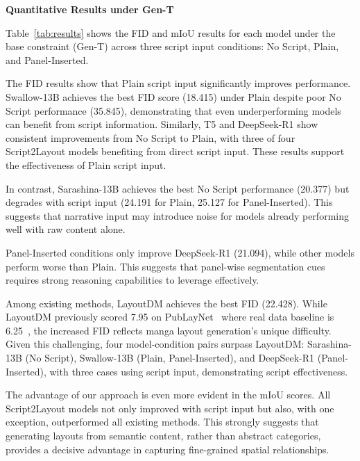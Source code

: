 \noindent\textbf{Quantitative Results under Gen-T}

Table~\ref{tab:results} shows the FID and mIoU results for each model under the base constraint (Gen-T) across three script input conditions: No Script, Plain, and Panel-Inserted.

The FID results show that Plain script input significantly improves performance. Swallow-13B achieves the best FID score (18.415) under Plain despite poor No Script performance (35.845), demonstrating that even underperforming models can benefit from script information. Similarly, T5 and DeepSeek-R1 show consistent improvements from No Script to Plain, with three of four Script2Layout models benefiting from direct script input. These results support the effectiveness of Plain script input. 

In contrast, Sarashina-13B achieves the best No Script performance (20.377) but degrades with script input (24.191 for Plain, 25.127 for Panel-Inserted). This suggests that narrative input may introduce noise for models already performing well with raw content alone.

Panel-Inserted conditions only improve DeepSeek-R1 (21.094), while other models perform worse than Plain. This suggests that panel-wise segmentation cues requires strong reasoning capabilities to leverage effectively.

Among existing methods, LayoutDM achieves the best FID (22.428). While LayoutDM previously scored 7.95 on PubLayNet~\cite{zhong_publaynet_2019} where real data baseline is 6.25~\cite{inoue2023layoutdm}, the increased FID reflects manga layout generation's unique difficulty. Given this challenging, four model-condition pairs surpass LayoutDM: Sarashina-13B (No Script), Swallow-13B (Plain, Panel-Inserted), and DeepSeek-R1 (Panel-Inserted), with three cases using script input, demonstrating script effectiveness.

The advantage of our approach is even more evident in the mIoU scores. All Script2Layout models not only improved with script input but also, with one exception, outperformed all existing methods. This strongly suggests that generating layouts from semantic content, rather than abstract categories, provides a decisive advantage in capturing fine-grained spatial relationships.

